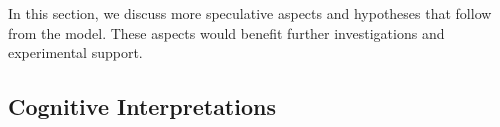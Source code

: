 \documentclass{frontiersSCNS} %
\begin{document}
In this section, we discuss more speculative aspects and hypotheses that follow
from the model. These aspects would benefit further investigations and
experimental support.

\subsection{Cognitive Interpretations}
\label{sec:cognitive-model}


%
%
%
%
%
%
%
%
%
%
%
\end{document}
